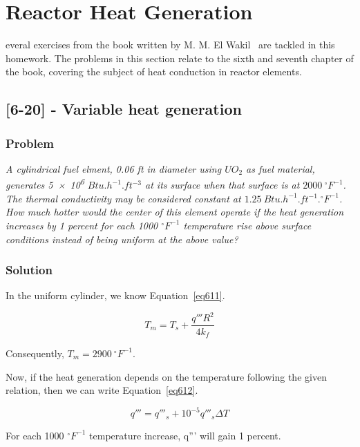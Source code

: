 %
%
\let\textcircled=\pgftextcircled
\chapter{Reactor Heat Generation}
\label{chap:intro}

everal exercises from the book written by M. M. El Wakil~\cite{book01} are tackled in this homework. The problems in this section relate to the sixth and seventh chapter of the book, covering the subject of heat conduction in reactor elements.

\section{[6-20] - Variable heat generation}
\label{prob51}

\subsection{Problem}
\textit{A cylindrical fuel elment, 0.06 ft in diameter using $UO_2$ as fuel material, generates \num{5e6} $Btu.h^{-1}.ft^{-3}$ at its surface when that surface is at $2000\ {}^\circ F^{-1}$. The thermal conductivity may be considered constant at $1.25\ Btu.h^{-1}.ft^{-1}.{}^\circ F^{-1}$. How much hotter would the center of this element operate if the heat generation increases by 1 percent for each 1000 ${}^\circ F^{-1}$ temperature rise above surface conditions instead of being uniform at the above value?}

\subsection{Solution}

In the uniform cylinder, we know Equation~\ref{eq611}.

\begin{equation}\label{eq611}
T_m = T_s + \frac{q'''R^2}{4k_f}
\end{equation}

Consequently, $T_m = 2900\ {}^\circ F^{-1}$.

Now, if the heat generation depends on the temperature following the given relation, then we can write Equation~\ref{eq612}.

\begin{equation}\label{eq612}
q''' = q'''_s + 10^{-5}q'''_s\Delta T
\end{equation}

For each 1000 ${}^\circ F^{-1}$ temperature increase, q''' will gain 1 percent.

